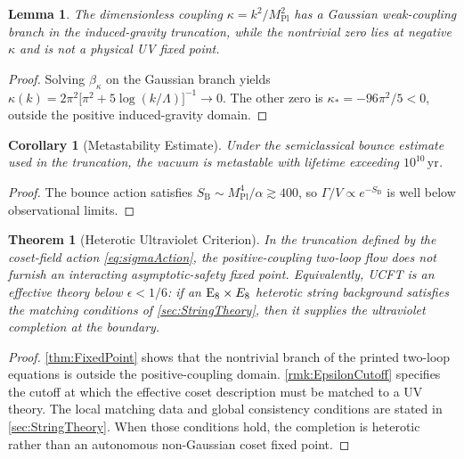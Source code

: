 \documentclass[pdflatex,sn-mathphys-num]{sn-jnl}
\theoremstyle{thmstyleone}
\newtheorem{theorem}{Theorem}
\newtheorem{lemma}[lemma]{Lemma}
\newtheorem{corollary}[corollary]{Corollary}
\theoremstyle{thmstylethree}%
\theoremstyle{thmstyletwo}%
\begin{document}
\begin{lemma}\label{lem:kappaIrrel}
The dimensionless coupling
\(
  \kappa=k^{2}/M_{\mathrm{Pl}}^{2}
\)
has a Gaussian weak-coupling branch in the induced-gravity truncation, while
the nontrivial zero lies at negative \(\kappa\) and is not a physical UV fixed
point.
\end{lemma}

\begin{proof}
Solving $\beta_\kappa$ on the Gaussian branch yields
\(
  \kappa(k)=
  2\pi^{2}\bigl[\pi^{2}+5\log(k/\Lambda)\bigr]^{-1}
  \to0
\).
The other zero is
\(\kappa_{\ast}=-96\pi^{2}/5<0\), outside the positive induced-gravity domain.
\end{proof}

\begin{corollary}[Metastability Estimate]\label{cor:Metastable}
Under the semiclassical bounce estimate used in the truncation, the vacuum is
metastable with lifetime exceeding
\(10^{10}\,\mathrm{yr}\).
\end{corollary}

\begin{proof}
The bounce action satisfies
$S_{\text{B}}\sim M_{\mathrm{Pl}}^{4}/\alpha
 \gtrsim400$,
so \(\Gamma/V\propto e^{-S_{\text{B}}}\) is well below observational
limits.
\end{proof}

\begin{theorem}[Heterotic Ultraviolet Criterion]
\label{thm:UVcomplete}
In the truncation defined by the coset-field action \eqref{eq:sigmaAction}, the
positive-coupling two-loop flow does not furnish an interacting
asymptotic-safety fixed point. Equivalently, UCFT is an effective theory
below \(\epsilon<1/6\): if an $\mathrm{E}_{8}\times E_{8}$ heterotic string background
satisfies the matching conditions of
\autoref{sec:StringTheory}, then it supplies the
ultraviolet completion at the boundary.
\end{theorem}

\begin{proof}
\autoref{thm:FixedPoint} shows that the nontrivial branch of the printed
two-loop equations is outside the positive-coupling domain.
\autoref{rmk:EpsilonCutoff} specifies the cutoff at which the effective coset
description must be matched to a UV theory. The local matching data and global
consistency conditions are stated in \autoref{sec:StringTheory}. When those conditions hold,
the completion is heterotic rather than an autonomous non-Gaussian coset fixed
point.
\end{proof}
\end{document}
